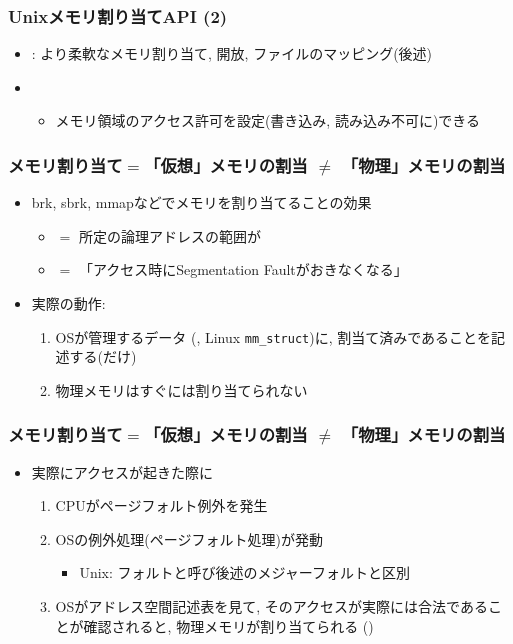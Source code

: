 \documentclass[12pt,dvipdfmx]{beamer}
\begin{document}
\begin{frame}
  \frametitle{Unixメモリ割り当てAPI (2)}
  \begin{itemize}
  \item {} : より柔軟なメモリ割り当て, 開放, ファイルのマッピング(後述)
  \item {}
    \begin{itemize}
    \item メモリ領域のアクセス許可を設定(書き込み, 読み込み不可に)できる
    \end{itemize}
  \end{itemize}
\end{frame}

\begin{frame}
  \frametitle{メモリ割り当て$=$「仮想」メモリの割当 $\neq$ 「物理」メモリの割当}
  \begin{itemize}
  \item brk, sbrk, mmapなどでメモリを割り当てることの効果
    \begin{itemize}
    \item $=$ 所定の論理アドレスの範囲が
    \item $=$ 「アクセス時にSegmentation Faultがおきなくなる」
    \end{itemize}
  \item 実際の動作:
    \begin{enumerate}
    \item OSが管理するデータ
      (, Linux {\tt mm\_struct})に,
      割当て済みであることを記述する(だけ)
    \item 物理メモリはすぐには割り当てられない
    \end{enumerate}
  \end{itemize}
\end{frame}

\begin{frame}
  \frametitle{メモリ割り当て$=$「仮想」メモリの割当 $\neq$ 「物理」メモリの割当}
  \begin{itemize}
  \item 実際にアクセスが起きた際に
    \begin{enumerate}
    \item CPUがページフォルト例外を発生
    \item OSの例外処理(ページフォルト処理)が発動
      \begin{itemize}
      \item Unix: フォルトと呼び後述のメジャーフォルトと区別
      \end{itemize}
    \item OSがアドレス空間記述表を見て,
      そのアクセスが実際には合法であることが確認されると,
      物理メモリが割り当てられる
      ()
    \end{enumerate}
  \end{itemize}
\end{frame}
\end{document}
